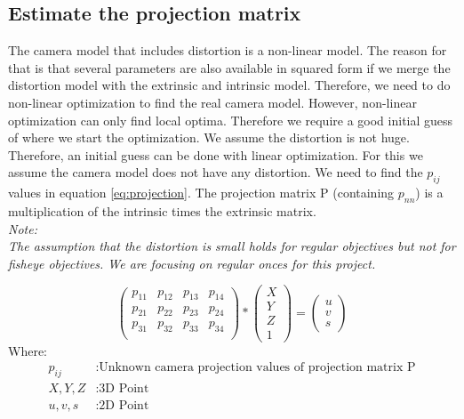 \documentclass[11pt,a4paper,titlepage,oneside]{report}
\begin{document}
\subsection{Estimate the projection matrix}\label{sec:est_proj}
The camera model that includes distortion is a non-linear model. The reason for that is that several parameters are also available in squared form if we merge the distortion model with the extrinsic and intrinsic model. Therefore, we need to do non-linear optimization to find the real camera model. However, non-linear optimization can only find local optima. Therefore we require a good initial guess of where we start the optimization. We assume the distortion is not huge. Therefore, an initial guess can be done with linear optimization. For this we assume the camera model does not have any distortion. We need to find the $p_{ij}$ values in equation \ref{eq:projection}. The projection matrix P (containing $p_{nn}$) is a multiplication of the intrinsic times the extrinsic matrix.\\
\em
Note:\\
The assumption that the distortion is small holds for regular objectives but not for fisheye objectives. We are focusing on regular onces for this project.
\normalfont

\begin{equation}\label{eq:projection}
	\begin{pmatrix}p_{11} & p_{12} & p_{13} & p_{14}\\
		p_{21} & p_{22} & p_{23} & p_{24}\\
		p_{31} & p_{32} & p_{33} & p_{34}\\
	\end{pmatrix}*
	\begin{pmatrix}
		X \\
		Y \\
		Z \\
		1
	\end{pmatrix}=
	\begin{pmatrix}
		u \\
		v \\
		s
  \end{pmatrix}
\end{equation}
Where:
\begin{align*}
	p_{ij}		&: \text{Unknown camera projection values of projection matrix P}\\
	X,Y,Z			&: \text{3D Point}\\
	u,v,s			&: \text{2D Point}\\
\end{align*}
\end{document}
